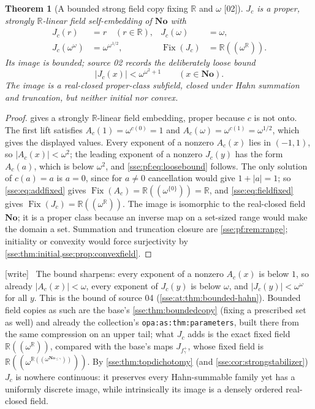 \documentclass[11pt,a4paper]{article}
\numberwithin{equation}{section}
\theoremstyle{plain}
\newtheorem{theorem}{Theorem}[section]
\theoremstyle{definition}
\theoremstyle{remark}
\newcommand{\No}{\mathbf{No}}
\newcommand{\R}{\mathbb{R}}
\newcommand{\Fix}{\operatorname{Fix}}
\newcommand{\NF}[1]{\R((\omega^{#1}))}
\newcommand{\lbl}[1]{\nolinkurl{#1}}%
\newcommand{\src}[1]{\textup{\textsf{\small[#1]}}}%
\newcommand{\wtag}{\textup{\textsf{[write]}}}%
\newenvironment{wnote}{\par\smallskip\noindent\wtag\ }{\par\smallskip}
\begin{document}
\begin{theorem}[A bounded strong field copy fixing $\R$ and $\omega$ \src{02}]\label{sse:pf:thm:bounded}
$J_c$ is a proper, strongly $\R$-linear field self-embedding of $\No$ with
\begin{align*}
 J_c(r)&=r\quad(r\in\R), & J_c(\omega)&=\omega,\\
 J_c(\omega^\omega)&=\omega^{\omega^{1/2}}, & \Fix(J_c)&=\NF{\R}.
\end{align*}
Its image is bounded; source 02 records the deliberately loose bound
\begin{equation}\label{sse:pf:eq:loosebound}
 |J_c(x)|<\omega^{\omega^2+1}\qquad(x\in\No).
\end{equation}
The image is a real-closed proper-class subfield, closed under Hahn
summation and truncation, but neither initial nor convex.
\end{theorem}
\begin{proof}
 gives a strongly $\R$-linear field embedding,
proper because $c$ is not onto. The first lift satisfies
$A_c(1)=\omega^{c(0)}=1$ and $A_c(\omega)=\omega^{c(1)}=\omega^{1/2}$, which
gives the displayed values. Every exponent of a nonzero $A_c(x)$ lies in
$(-1,1)$, so $|A_c(x)|<\omega^2$; the leading exponent of a nonzero
$J_c(y)$ has the form $A_c(a)$, which is below $\omega^2$, and
\eqref{sse:pf:eq:loosebound} follows. The only solution of $c(a)=a$ is
$a=0$, since for $a\ne0$ cancellation would give $1+|a|=1$; so
\eqref{sse:eq:addfixed} gives $\Fix(A_c)=\NF{\{0\}}=\R$, and
\eqref{sse:eq:fieldfixed} gives $\Fix(J_c)=\NF{\R}$. The image is isomorphic
to the real-closed field $\No$; it is a proper class because an inverse map
on a set-sized range would make the domain a set. Summation and truncation
closure are \cref{sse:pf:rem:range}; initiality or convexity would force
surjectivity by \cref{sse:thm:initial,sse:prop:convexfield}.
\end{proof}

\begin{wnote}
The bound sharpens: every exponent of a nonzero $A_c(x)$ is below $1$,
so already $|A_c(x)|<\omega$, every exponent of $J_c(y)$ is below
$\omega$, and $|J_c(y)|<\omega^\omega$ for all $y$. This is the bound of
source 04 (\cref{sse:at:thm:bounded-hahn}). Bounded field copies as such
are the base's \cref{sse:thm:boundedcopy} (fixing a prescribed set as
well) and already the collection's \lbl{opa:as:thm:parameters}, built there
from the same compression on an upper tail; what $J_c$ adds is the exact
fixed field $\NF{\R}$, compared with the base's maps
$J_{f^+_\gamma}$, whose fixed field is $\NF{\NF{\No_{\le\gamma}}}$.
By \cref{sse:thm:topdichotomy} (and \cref{sse:cor:strongstabilizer}) $J_c$
is nowhere continuous: it preserves every Hahn-summable family yet has a
uniformly discrete image, while intrinsically its image is a densely
ordered real-closed field.
\end{wnote}
\end{document}
